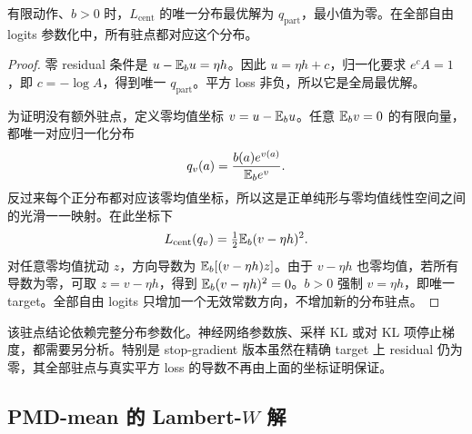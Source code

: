 \begin{proposition}
\label{prop:pmdmean-centered-exact}
有限动作、$b>0$ 时，$L_{\mathrm{cent}}$ 的唯一分布最优解为 $q_{\mathrm{part}}$，最小值为零。在全部自由 logits 参数化中，所有驻点都对应这个分布。
\end{proposition}
\begin{proof}
零 residual 条件是 $u-\mathbb{E}_bu=\eta h$。因此 $u=\eta h+c$，归一化要求 $e^cA=1$，即 $c=-\log A$，得到唯一 $q_{\mathrm{part}}$。平方 loss 非负，所以它是全局最优解。

为证明没有额外驻点，定义零均值坐标 $v=u-\mathbb{E}_bu$。任意 $\mathbb{E}_bv=0$ 的有限向量，都唯一对应归一化分布
\[
 q_v(a)=\frac{b(a)e^{v(a)}}{\mathbb{E}_b e^v}.
\]
反过来每个正分布都对应该零均值坐标，所以这是正单纯形与零均值线性空间之间的光滑一一映射。在此坐标下
\[
 L_{\mathrm{cent}}(q_v)=\tfrac12\mathbb{E}_b(v-\eta h)^2.
\]
对任意零均值扰动 $z$，方向导数为 $\mathbb{E}_b[(v-\eta h)z]$。由于 $v-\eta h$ 也零均值，若所有导数为零，可取 $z=v-\eta h$，得到 $\mathbb{E}_b(v-\eta h)^2=0$。$b>0$ 强制 $v=\eta h$，即唯一 target。全部自由 logits 只增加一个无效常数方向，不增加新的分布驻点。
\end{proof}

该驻点结论依赖完整分布参数化。神经网络参数族、采样 KL 或对 KL 项停止梯度，都需要另分析。特别是 stop-gradient 版本虽然在精确 target 上 residual 仍为零，其全部驻点与真实平方 loss 的导数不再由上面的坐标证明保证。

\subsection{PMD-mean 的 Lambert-$W$ 解}

